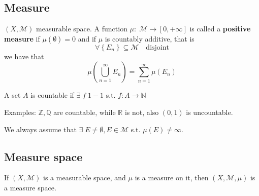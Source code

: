 \subsection{Measure}
\begin{definition}
    \((X, \mathcal{M})\) measurable space. A function \(\mu : \; \mathcal{M} \to [0, +\infty]\) is called a \textbf{positive measure} if \(\mu(\emptyset) = 0\) and if \(\mu\) is countably additive, that is 
    \[
        \forall \left\lbrace E_n \right\rbrace \subseteq \mathcal{M} \quad \mbox{disjoint}
    \]
    we have that \[
        \mu\left(\bigcup_{n=1}^{\infty} E_n\right) = \sum_{n = 1}^{\infty} \mu(E_n) \tag*{\(\sigma\)-additivity}
    \]
\end{definition}
\begin{remark}
    A set \(A\) is countable if \(\exists \; f \; 1-1\) s.t. \(f: A\to \mathbb{N}\)

    Examples: \(\mathbb{Z}, \mathbb{Q}\) are countable, while \(\mathbb{R}\) is not, also \((0,1)\) is uncountable.
\end{remark}
We always assume that \(\exists \; E \not = \emptyset, E \in \mathcal{M}\) s.t. \(\mu(E) \not = \infty\). 
\subsection{Measure space}
If \((X,\mathcal{M})\) is a measurable space, and \(\mu\) is a measure on it, then \((X, \mathcal{M}, \mu)\) is a measure space.

